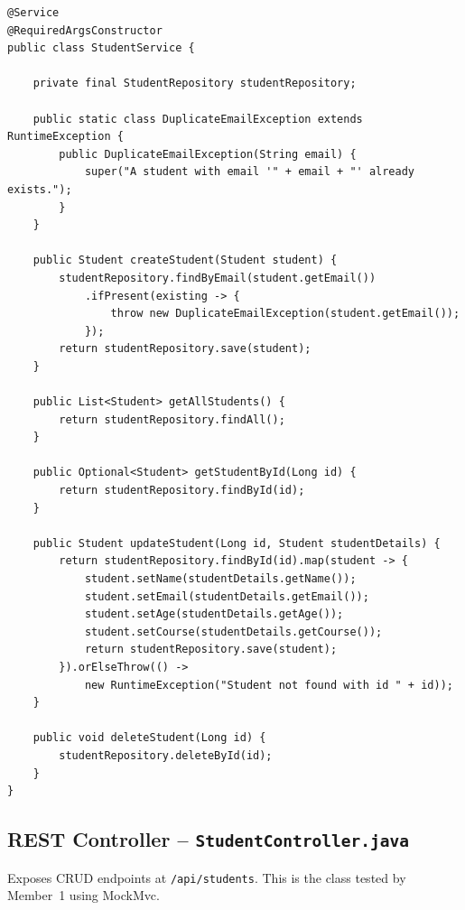 \documentclass[12pt,a4paper]{article}
\begin{document}
\begin{lstlisting}[style=javastyle, caption={Student service with business logic}]
@Service
@RequiredArgsConstructor
public class StudentService {

    private final StudentRepository studentRepository;

    public static class DuplicateEmailException extends RuntimeException {
        public DuplicateEmailException(String email) {
            super("A student with email '" + email + "' already exists.");
        }
    }

    public Student createStudent(Student student) {
        studentRepository.findByEmail(student.getEmail())
            .ifPresent(existing -> {
                throw new DuplicateEmailException(student.getEmail());
            });
        return studentRepository.save(student);
    }

    public List<Student> getAllStudents() {
        return studentRepository.findAll();
    }

    public Optional<Student> getStudentById(Long id) {
        return studentRepository.findById(id);
    }

    public Student updateStudent(Long id, Student studentDetails) {
        return studentRepository.findById(id).map(student -> {
            student.setName(studentDetails.getName());
            student.setEmail(studentDetails.getEmail());
            student.setAge(studentDetails.getAge());
            student.setCourse(studentDetails.getCourse());
            return studentRepository.save(student);
        }).orElseThrow(() ->
            new RuntimeException("Student not found with id " + id));
    }

    public void deleteStudent(Long id) {
        studentRepository.deleteById(id);
    }
}
\end{lstlisting}

\subsection{REST Controller -- \texttt{StudentController.java}}

Exposes CRUD endpoints at \texttt{/api/students}. This is the class tested by Member~1 using MockMvc.
\end{document}
